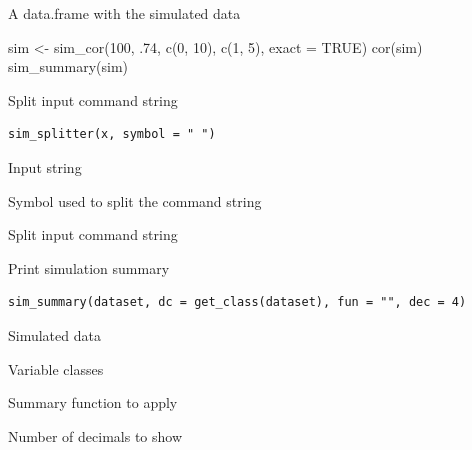 \documentclass[a4paper]{book}
\begin{document}
%
\begin{Value}
A data.frame with the simulated data
\end{Value}
%
\begin{Examples}
\begin{ExampleCode}
sim <- sim_cor(100, .74, c(0, 10), c(1, 5), exact = TRUE)
cor(sim)
sim_summary(sim)

\end{ExampleCode}
\end{Examples}
%
\begin{Description}
Split input command string
\end{Description}
%
\begin{Usage}
\begin{verbatim}
sim_splitter(x, symbol = " ")
\end{verbatim}
\end{Usage}
%
\begin{Arguments}
\begin{ldescription}
\item[\code{x}] Input string

\item[\code{symbol}] Symbol used to split the command string
\end{ldescription}
\end{Arguments}
%
\begin{Value}
Split input command string
\end{Value}
%
\begin{Description}
Print simulation summary
\end{Description}
%
\begin{Usage}
\begin{verbatim}
sim_summary(dataset, dc = get_class(dataset), fun = "", dec = 4)
\end{verbatim}
\end{Usage}
%
\begin{Arguments}
\begin{ldescription}
\item[\code{dataset}] Simulated data

\item[\code{dc}] Variable classes

\item[\code{fun}] Summary function to apply

\item[\code{dec}] Number of decimals to show
\end{ldescription}
\end{Arguments}
\end{document}
